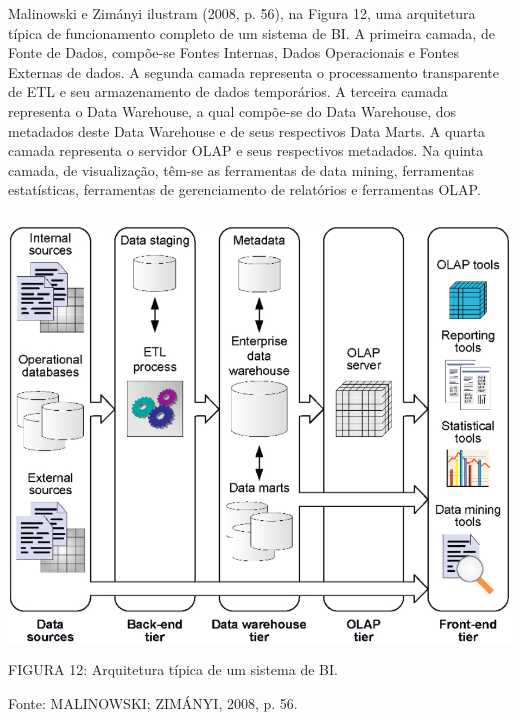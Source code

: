 \documentclass[a4paper]{article}
\begin{document}
{
\textsf{Malinowski e Zim\'anyi ilustram (2008, p. 56), na Figura 12, uma arquitetura t\'ipica de funcionamento completo
de um sistema de BI. A primeira camada, de Fonte de Dados, comp\~oe-se Fontes Internas, Dados Operacionais e Fontes
Externas de dados. A segunda camada representa o processamento transparente de ETL e seu armazenamento de dados
tempor\'arios. A terceira camada representa o Data Warehouse, a qual comp\~oe-se do Data Warehouse, dos metadados deste
Data Warehouse e de seus respectivos Data Marts. A quarta camada representa o servidor OLAP e seus respectivos
metadados. Na quinta camada, de visualiza\c{c}\~ao, t\^em-se as ferramentas de data mining, ferramentas estat\'isticas,
ferramentas de gerenciamento de relat\'orios e ferramentas OLAP.}}

{
 \includegraphics[width=14.102cm,height=11.684cm]{monograph-img012.jpg} \textsf{\MakeUppercase{ \newline
\newline
FIGURA }}\textsf{12: Arquitetura t\'ipica de um sistema de BI. }}

{
\textsf{Fonte: MALINOWSKI; ZIM\'ANYI, 2008, p. 56. }}
\end{document}
